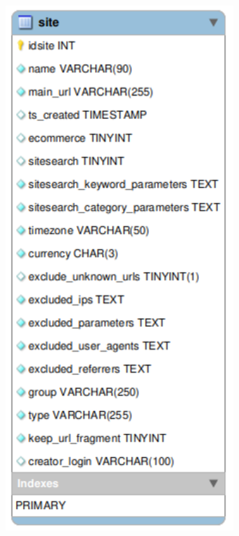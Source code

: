 \begin{figure}[h]
    \centering
    \begin{minipage}{0.48\textwidth}
        \centering
        \includegraphics[width=\textwidth]{images/site.png}

\end{minipage}
\end{figure}
